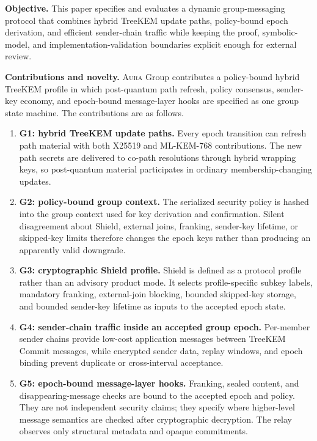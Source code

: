 \documentclass[preprint,12pt]{elsarticle}
\theoremstyle{definition}
\newcommand{\tech}[1]{\textnormal{#1}}
\newcommand{\Aura}{\textsc{Aura}}
\newcommand{\TreeKEM}{\tech{TreeKEM}}
\newcommand{\Shield}{\tech{Shield}}
\renewcommand{\DH}{\tech{X25519}}
\newcommand{\KEM}{\tech{ML-KEM-768}}
\begin{document}
\medskip
\noindent\textbf{Objective.} This paper specifies and evaluates a dynamic
group-messaging protocol that combines hybrid TreeKEM update paths,
policy-bound epoch derivation, and efficient sender-chain traffic while keeping
the proof, symbolic-model, and implementation-validation boundaries explicit
enough for external review.

\medskip
\noindent\textbf{Contributions and novelty.}
\Aura{} Group contributes a policy-bound hybrid \TreeKEM{} profile in which
post-quantum path refresh, policy consensus, sender-key economy, and
epoch-bound message-layer hooks are specified as one group state machine. The
contributions are as follows.

\begin{enumerate}
  \item \textbf{G1: hybrid TreeKEM update paths.} Every epoch transition can
  refresh path material with both \DH{} and \KEM{} contributions. The new path
  secrets are delivered to co-path resolutions through hybrid wrapping keys,
  so post-quantum material participates in ordinary membership-changing
  updates.

  \item \textbf{G2: policy-bound group context.} The serialized security policy is
  hashed into the group context used for key derivation and confirmation.
  Silent disagreement about \Shield{}, external joins, franking, sender-key
  lifetime, or skipped-key limits therefore changes the epoch keys rather than
  producing an apparently valid downgrade.

  \item \textbf{G3: cryptographic Shield profile.} \Shield{} is defined as a
  protocol profile rather than an advisory product mode. It selects
  profile-specific subkey labels, mandatory franking, external-join blocking,
  bounded skipped-key storage, and bounded sender-key lifetime as inputs to
  the accepted epoch state.

  \item \textbf{G4: sender-chain traffic inside an accepted group epoch.}
  Per-member sender chains provide low-cost application messages between
  TreeKEM Commit messages, while encrypted sender data, replay windows, and
  epoch binding prevent duplicate or cross-interval acceptance.

  \item \textbf{G5: epoch-bound message-layer hooks.} Franking, sealed content,
  and disappearing-message checks are bound to the accepted epoch and policy.
  They are not independent security claims; they specify where higher-level
  message semantics are checked after cryptographic decryption. The relay
  observes only structural metadata and opaque commitments.


\end{enumerate}
\end{document}
